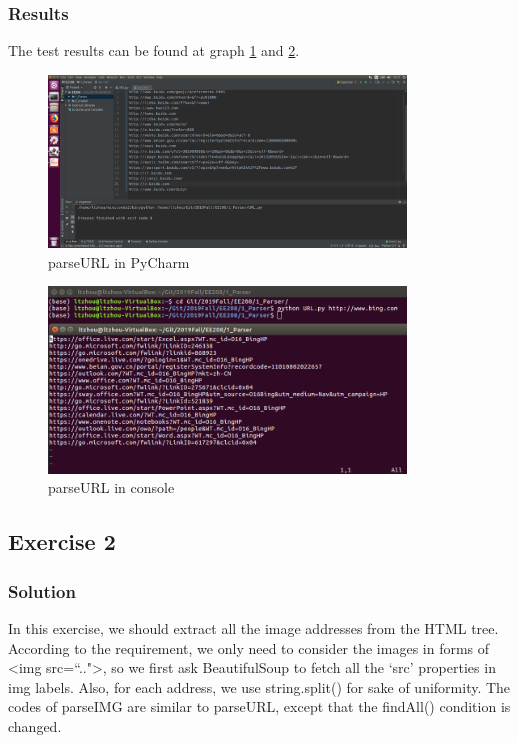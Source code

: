 \documentclass{article}
\begin{document}
\subsubsection{Results}
The test results can be found at graph \ref{img:1.1} and \ref{img:1.2}.

\begin{figure}[htbp]
\centering
\includegraphics[width=9.5cm]{img/test1_1.png}
\caption{parseURL in PyCharm}
\label{img:1.1}
\end{figure}

\begin{figure}[htbp]
\centering
\includegraphics[width=9.5cm]{img/test1_2.png}
\caption{parseURL in console}
\label{img:1.2}
\end{figure}

\subsection{Exercise 2}

\subsubsection{Solution}

In this exercise, we should extract all the image addresses from the HTML tree. According to the requirement, we only need to consider the images in forms of <img src=``..">, so we first ask BeautifulSoup to fetch all the `src' properties in img labels. Also, for each address, we use string.split() for sake of uniformity. The codes of parseIMG are similar to parseURL, except that the findAll() condition is changed.
\end{document}
